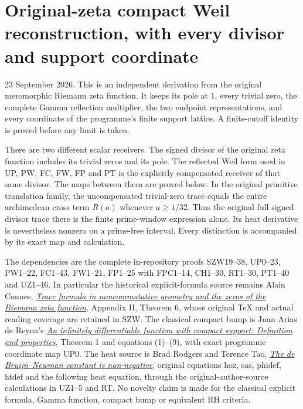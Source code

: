 \documentclass[
  10pt,
  a4paper,
]{article}
\author{}
\date{}
\begin{document}
{
\setcounter{tocdepth}{3}
\tableofcontents
}
\section{Original-zeta compact Weil reconstruction, with every divisor
and support
coordinate}\label{original-zeta-compact-weil-reconstruction-with-every-divisor-and-support-coordinate}

23 September 2026. This is an independent derivation from the original
meromorphic Riemann zeta function. It keeps its pole at \(1\), every
trivial zero, the complete Gamma reflection multiplier, the two endpoint
representations, and every coordinate of the programme's finite support
lattice. A finite-cutoff identity is proved before any limit is taken.

There are two different scalar receivers. The signed divisor of the
original zeta function includes its trivial zeros and its pole. The
reflected Weil form used in UP, PW, FC, FW, FP and PT is the explicitly
compensated receiver of that same divisor. The maps between them are
proved below. In the original primitive translation family, the
uncompensated trivial-zero trace equals the entire archimedean cross
term \(R(a)\) whenever \(a\ge1/32\). Thus the original full signed
divisor trace there is the finite prime-window expression alone. Its
heat derivative is nevertheless nonzero on a prime-free interval. Every
distinction is accompanied by its exact map and calculation.

The dependencies are the complete in-repository proofs SZW19--38,
UP0--23, PW1--22, FC1--43, FW1--21, FP1--25 with FPC1--14, CH1--30,
RT1--30, PT1--40 and UZ1--46. In particular the historical
explicit-formula source remains Alain Connes,
\href{https://arxiv.org/abs/math/9811068}{\emph{Trace formula in
noncommutative geometry and the zeros of the Riemann zeta function}},
Appendix II, Theorem 6, whose original TeX and actual reading coverage
are retained in SZW. The classical compact bump is Juan Arias de Reyna's
\href{https://arxiv.org/abs/1702.05442v1}{\emph{An infinitely
differentiable function with compact support: Definition and
properties}}, Theorem 1 and equations (1)--(9), with exact programme
coordinate map UP0. The heat source is Brad Rodgers and Terence Tao,
\href{https://arxiv.org/abs/1801.05914v5}{\emph{The de Bruijn--Newman
constant is non-negative}}, original equations hoz, sas, phidef, htdef
and the following heat equation, through the original-author-source
calculations in UZ1--5 and RT. No novelty claim is made for the
classical explicit formula, Gamma function, compact bump or equivalent
RH criteria.
\end{document}
